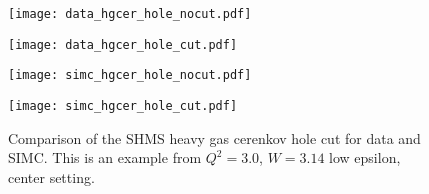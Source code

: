 \begin{figure}
  \centering
  \begin{minipage}[b]{0.48\linewidth}
    \texttt{[image: data\_hgcer\_hole\_nocut.pdf]}
  \end{minipage}
  \hfill
  \begin{minipage}[b]{0.48\linewidth}
    \texttt{[image: data\_hgcer\_hole\_cut.pdf]}
  \end{minipage}
  
  \vspace{0.5cm}
  
  \begin{minipage}[b]{0.48\linewidth}
    \texttt{[image: simc\_hgcer\_hole\_nocut.pdf]}
  \end{minipage}
  \hfill
  \begin{minipage}[b]{0.48\linewidth}
    \texttt{[image: simc\_hgcer\_hole\_cut.pdf]}
  \end{minipage}
  
  \caption{Comparison of the SHMS heavy gas cerenkov hole cut for data and SIMC. This is an example from $Q^2=3.0$, $W=3.14$ low epsilon, center setting.}
  \label{fig:3-3_hgcer_hole_cut}
\end{figure}

